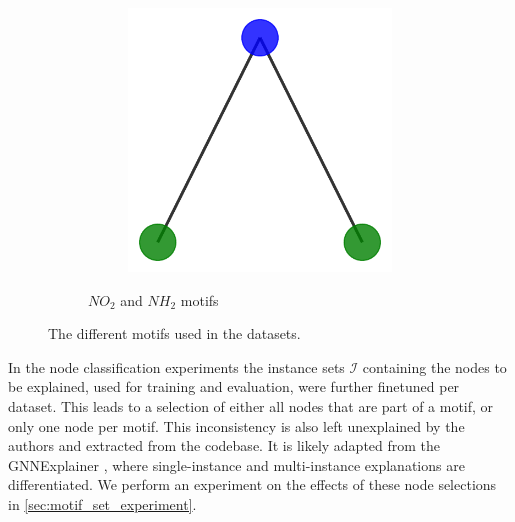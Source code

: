 \begin{figure}[h]
\begin{subfigure}[b]{0.30\textwidth}
\begin{subfigure}[b]{0.48\linewidth}
        \end{subfigure}
        \begin{subfigure}[b]{0.48\linewidth}
            \includegraphics[width=\linewidth]{img/Motif_Vis/MUTAG-MOTIF2.pdf}
        \end{subfigure}
        \caption{$NO_2$ and $NH_2$ motifs}
        \label{fig:subfig4}
    \end{subfigure}
    
    \caption{The different motifs used in the datasets.}
    \label{fig:motifs}
\end{figure}

In the node classification experiments the instance sets $\mathcal{I}$ containing the nodes to be explained, used for training and evaluation, were further finetuned per dataset. This leads to a selection of either all nodes that are part of a motif, or only one node per motif. This inconsistency is also left unexplained by the authors and extracted from the codebase. It is likely adapted from the GNNExplainer \cite{ying2019gnnexplainer}, where single-instance and multi-instance explanations are differentiated. We perform an experiment on the effects of these node selections in \ref{sec:motif_set_experiment}.

